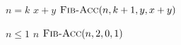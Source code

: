 \begin{codebox}
\li \If $n = k$  \Return $x+y$
\li \Else \Return $\textnormal{\scshape Fib-Acc}(n, k+1, y, x+y)$
\end{codebox}
\begin{codebox}
\li \If $n \le 1$  \Return $n$
\li \Else \Return $\textnormal{\scshape Fib-Acc}(n, 2, 0, 1)$
\end{codebox}
